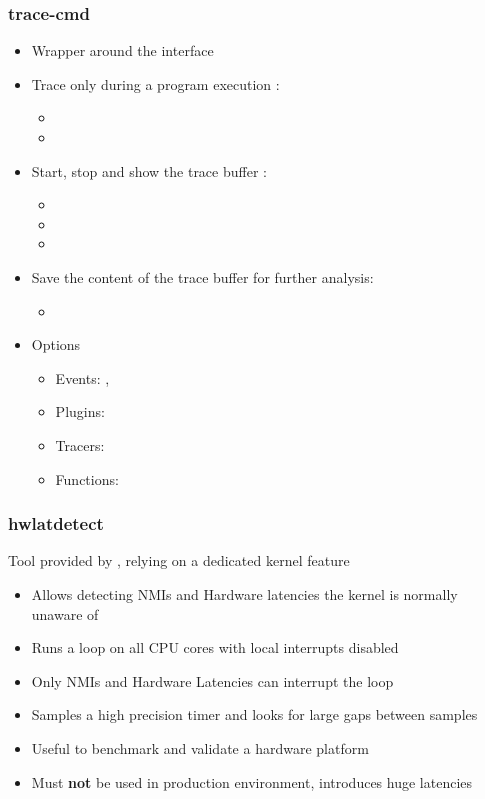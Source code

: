 \begin{frame}
	\frametitle{trace-cmd}
	\begin{itemize}
		\item Wrapper around the  interface
		\item Trace only during a program execution :
			\begin{itemize}
				\item {}
				\item {}
			\end{itemize}
		\item Start, stop and show the trace buffer :
			\begin{itemize}
				\item {}
				\item {}
				\item {}
			\end{itemize}
		\item Save the content of the trace buffer for further analysis:
			\begin{itemize}
				\item {}
			\end{itemize}
		\item Options
			\begin{itemize}
				\item Events: , 
				\item Plugins: 
				\item Tracers: 
				\item Functions: 
			\end{itemize}
	\end{itemize}
\end{frame}

\begin{frame}
	\frametitle{hwlatdetect}
	Tool provided by , relying on a dedicated kernel feature
	\begin{itemize}
		\item Allows detecting NMIs and Hardware latencies the kernel is normally unaware of
		\item Runs a loop on all CPU cores with local interrupts disabled
		\item Only NMIs and Hardware Latencies can interrupt the loop
		\item Samples a high precision timer and looks for large gaps between samples
		\item Useful to benchmark and validate a hardware platform
		\item Must \textbf{not} be used in production environment, introduces huge latencies
	\end{itemize}
\end{frame}

